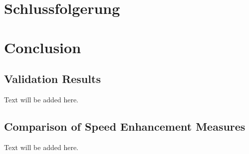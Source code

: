 {\chapter{Schlussfolgerung}}
{\chapter{Conclusion}}

\label{sec:results}

\section{Validation Results}
Text will be added here.

\section{Comparison of Speed Enhancement Measures}
Text will be added here.

